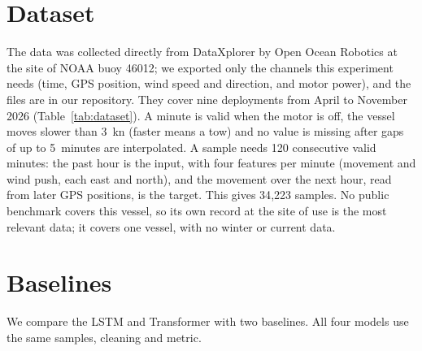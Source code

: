 \documentclass[sigconf]{acmart}
\begin{document}
\section{Dataset}
The data was collected directly from DataXplorer by Open Ocean Robotics at the site of NOAA buoy 46012; we exported only the channels this experiment needs (time, GPS position, wind speed and direction, and motor power), and the files are in our repository. They cover nine deployments from April to November 2026 (Table~\ref{tab:dataset}). A minute is valid when the motor is off, the vessel moves slower than 3~kn (faster means a tow) and no value is missing after gaps of up to 5~minutes are interpolated. A sample needs 120 consecutive valid minutes: the past hour is the input, with four features per minute (movement and wind push, each east and north), and the movement over the next hour, read from later GPS positions, is the target. This gives 34{,}223 samples. No public benchmark covers this vessel, so its own record at the site of use is the most relevant data; it covers one vessel, with no winter or current data.



\section{Baselines}

We compare the LSTM and Transformer with two baselines. All four models use the same samples, cleaning and metric.
\end{document}
